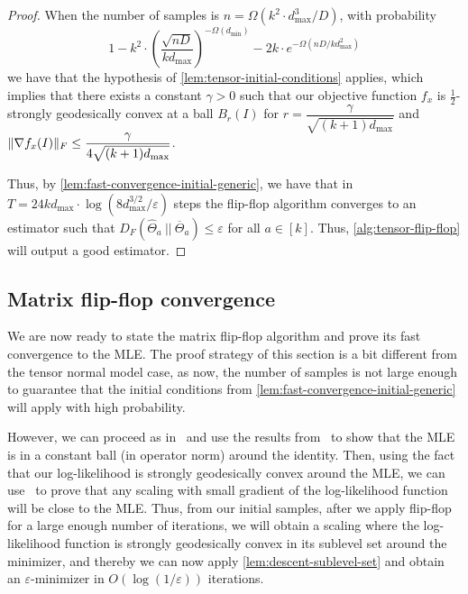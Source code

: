 \documentclass[aos]{imsart}
\theoremstyle{definition}
\numberwithin{equation}{section}
\DeclarePairedDelimiter{\norm}{\lVert}{\rVert}
\newcommand{\otheta}{\overline{\Theta}}
\newcommand{\htheta}{\widehat{\Theta}}
\newcommand{\eps}{\varepsilon}
\def\dmin{d_{\min}}
\def\dmax{d_{\max}}
\begin{document}
\begin{proof}
	When the number of samples is $n = \Omega(k^2 \cdot \dmax^3/D)$, with probability 
	$$ 1 - k^2 \cdot \left( \dfrac{\sqrt{nD}}{k \dmax} \right)^{-\Omega(\dmin)} - 2k \cdot e^{- \Omega(nD/k \dmax^2)}$$ 
	we have that the hypothesis of \cref{lem:tensor-initial-conditions} applies, which implies that there exists a constant $\gamma > 0$ such that our objective function $f_x$ is $\frac{1}{2}$-strongly geodesically convex at a ball $B_r(I)$ for $r = \dfrac{\gamma}{\sqrt{(k+1)\dmax}}$ and $\norm{\nabla f_x(I)}_F \leq \dfrac{\gamma}{4 \sqrt{(k+1)\dmax}}$.
	
Thus, by \cref{lem:fast-convergence-initial-generic}, we have that in $T = 24k \dmax \cdot \log(8 \dmax^{3/2}/\eps)$ steps the flip-flop algorithm converges to an estimator such that $D_F(\htheta_a \ || \ \otheta_a) \leq \eps$ for all $a \in [k]$. Thus, \cref{alg:tensor-flip-flop} will output a good estimator.
\end{proof}

\subsection{Matrix flip-flop convergence}

We are now ready to state the matrix flip-flop algorithm and prove its fast convergence to the MLE. 
The proof strategy of this section is a bit different from the tensor normal model case, as now, the number of samples is not large enough to guarantee that the initial conditions from \cref{lem:fast-convergence-initial-generic} will apply with high probability.

However, we can proceed as in~\cite{FM20} and use the results from~\cite{KLR19} to show that the MLE is in a constant ball (in operator norm) around the identity. 
Then, using the fact that our log-likelihood is strongly geodesically convex around the MLE, we can use~\cite[Lemma 4.7]{FM20} to prove that any scaling with small gradient of the log-likelihood function will be close to the MLE.
Thus, from our initial samples, after we apply flip-flop for a large enough number of iterations, we will obtain a scaling where the log-likelihood function is strongly geodesically convex in its sublevel set around the minimizer, and thereby we can now apply \cref{lem:descent-sublevel-set} and obtain an $\varepsilon$-minimizer in $O(\log(1/\varepsilon))$ iterations.
\end{document}

